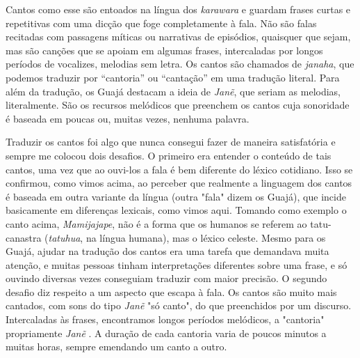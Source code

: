 Cantos como esse são entoados na língua dos \emph{karawara} e guardam
frases curtas e repetitivas com uma dicção que foge completamente à
fala. Não são falas recitadas com passagens míticas ou narrativas de
episódios, quaisquer que sejam, mas são canções que se apoiam em algumas
frases, intercaladas por longos períodos de vocalizes, melodias sem
letra. Os cantos são chamados de \emph{janaha}, que podemos traduzir por
``cantoria'' ou ``cantação'' em uma tradução literal. Para além da
tradução, os Guajá destacam a ideia de \emph{Janẽ}, que seriam as
melodias, literalmente. São os recursos melódicos que preenchem os
cantos cuja sonoridade é baseada em poucas ou, muitas vezes, nenhuma
palavra.

Traduzir os cantos foi algo que nunca consegui fazer de maneira
satisfatória e sempre me colocou dois desafios. O primeiro era entender
o conteúdo de tais cantos, uma vez que ao ouvi-los a fala é bem
diferente do léxico cotidiano. Isso se confirmou, como vimos acima, ao
perceber que realmente a linguagem dos cantos é baseada em outra
variante da língua (outra "fala" dizem os Guajá), que incide basicamente
em diferenças lexicais, como vimos aqui. Tomando como exemplo o canto
acima, \emph{Mamijajape}, não é a forma que os humanos se referem ao
tatu-canastra (\emph{tatuhua}, na língua humana), mas o léxico celeste.
Mesmo para os Guajá, ajudar na tradução dos cantos era uma tarefa que
demandava muita atenção, e muitas pessoas tinham interpretações
diferentes sobre uma frase, e só ouvindo diversas vezes conseguiam
traduzir com maior precisão. O segundo desafio diz respeito a um aspecto
que escapa à fala. Os cantos são muito mais cantados, com sons do tipo
\emph{Janẽ} "só canto", do que preenchidos por um discurso. Intercaladas
às frases, encontramos longos períodos melódicos, a "cantoria"
propriamente \emph{Janẽ} . A duração de cada cantoria varia de poucos
minutos a muitas horas, sempre emendando um canto a outro.

